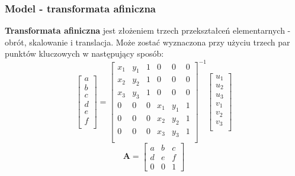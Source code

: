 \documentclass{article}
\begin{document}
	\subsubsection{Model - transformata afiniczna}
	\textbf{Transformata afiniczna} jest złożeniem trzech przekształceń elementarnych - obrót, skalowanie i translacja. Może zostać wyznaczona przy użyciu trzech par punktów kluczowych w następujący sposób:
	\begin{equation}
	\left[\begin{matrix}
	a \\
	b \\
	c \\
	d \\
	e \\
	f \\
	\end{matrix}\right]
	=
	\left[\begin{matrix}
	x_1 & y_1 & 1 & 0 & 0 & 0 \\
	x_2 & y_2 & 1 & 0 & 0 & 0 \\
	x_3 & y_3 & 1 & 0 & 0 & 0 \\
	0 & 0 & 0 & x_1 & y_1 & 1 \\
	0 & 0 & 0 & x_2 & y_2 & 1 \\
	0 & 0 & 0 & x_3 & y_3 & 1 \\
	\end{matrix}\right]^{-1}
	\left[\begin{matrix}
	u_1 \\
	u_2 \\
	u_3 \\
	v_1 \\
	v_2 \\
	v_3 \\
	\end{matrix}\right]
	\end{equation}
	\begin{equation}
	\textbf{A} =\left[\begin{matrix}
	a & b & c \\
	d & e & f \\
	0 & 0 & 1
	\end{matrix} \right]
	\end{equation}
\end{document}
